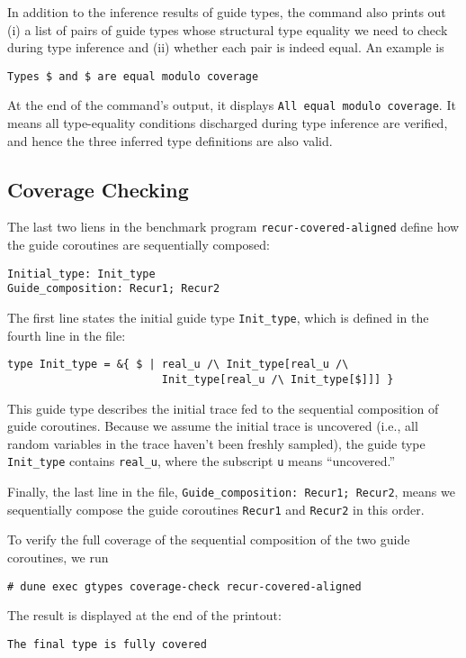 In addition to the inference results of guide types, the command also prints out
(i) a list of pairs of guide types whose structural type equality we need to
check during type inference and (ii) whether each pair is indeed equal.
%
An example is
\begin{verbatim}
Types $ and $ are equal modulo coverage
\end{verbatim}
%
At the end of the command's output, it displays \texttt{All equal modulo
  coverage}.
%
It means all type-equality conditions discharged during type inference are
verified, and hence the three inferred type definitions are also valid.

\subsection{Coverage Checking}

The last two liens in the benchmark program \texttt{recur-covered-aligned}
define how the guide coroutines are sequentially composed:
\begin{verbatim}
Initial_type: Init_type
Guide_composition: Recur1; Recur2
\end{verbatim}
%
The first line states the initial guide type \texttt{Init\_type}, which is
defined in the fourth line in the file:
\begin{verbatim}
type Init_type = &{ $ | real_u /\ Init_type[real_u /\
                        Init_type[real_u /\ Init_type[$]]] }
\end{verbatim}
%
This guide type describes the initial trace fed to the sequential composition of
guide coroutines.
%
Because we assume the initial trace is uncovered (i.e., all random variables in
the trace haven't been freshly sampled), the guide type \texttt{Init\_type}
contains \texttt{real\_u}, where the subscript \texttt{u} means ``uncovered.''

Finally, the last line in the file, \texttt{Guide\_composition: Recur1; Recur2},
means we sequentially compose the guide coroutines \texttt{Recur1} and
\texttt{Recur2} in this order.

To verify the full coverage of the sequential composition of the two guide
coroutines, we run
\begin{verbatim}
# dune exec gtypes coverage-check recur-covered-aligned
\end{verbatim}
%
The result is displayed at the end of the printout:
\begin{verbatim}
The final type is fully covered
\end{verbatim}
